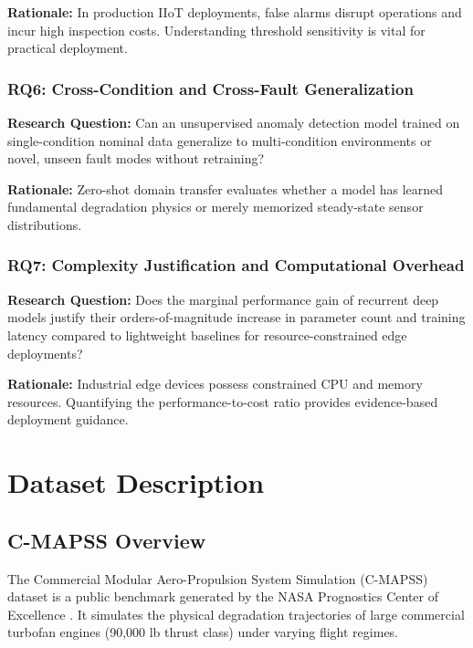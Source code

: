 \documentclass[12pt,a4paper,oneside]{report}
\begin{document}
\textbf{Rationale:} In production IIoT deployments, false alarms disrupt operations and incur high inspection costs. Understanding threshold sensitivity is vital for practical deployment.

\subsection{RQ6: Cross-Condition and Cross-Fault Generalization}
\textbf{Research Question:} Can an unsupervised anomaly detection model trained on single-condition nominal data generalize to multi-condition environments or novel, unseen fault modes without retraining?

\textbf{Rationale:} Zero-shot domain transfer evaluates whether a model has learned fundamental degradation physics or merely memorized steady-state sensor distributions.

\subsection{RQ7: Complexity Justification and Computational Overhead}
\textbf{Research Question:} Does the marginal performance gain of recurrent deep models justify their orders-of-magnitude increase in parameter count and training latency compared to lightweight baselines for resource-constrained edge deployments?

\textbf{Rationale:} Industrial edge devices possess constrained CPU and memory resources. Quantifying the performance-to-cost ratio provides evidence-based deployment guidance.

\chapter{Dataset Description}

\section{C-MAPSS Overview}
The Commercial Modular Aero-Propulsion System Simulation (C-MAPSS) dataset is a public benchmark generated by the NASA Prognostics Center of Excellence \cite{saxena2008damage}. It simulates the physical degradation trajectories of large commercial turbofan engines (90,000 lb thrust class) under varying flight regimes.
\end{document}
